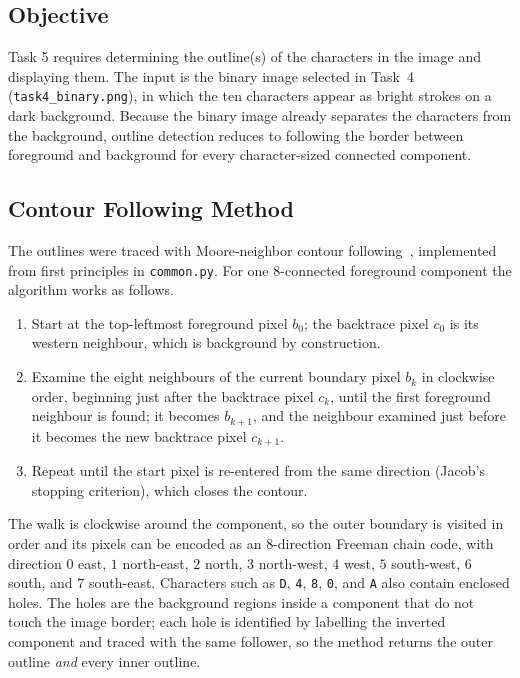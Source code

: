 \subsection{Objective}

Task 5 requires determining the outline(s) of the characters in the image and
displaying them.  The input is the binary image selected in Task~4
(\texttt{task4\_binary.png}), in which the ten characters appear as bright
strokes on a dark background.  Because the binary image already separates the
characters from the background, outline detection reduces to following the
border between foreground and background for every character-sized connected
component.

\subsection{Contour Following Method}

The outlines were traced with Moore-neighbor contour following~\cite{contourtracing}, implemented
from first principles in \texttt{common.py}.  For one 8-connected foreground
component the algorithm works as follows.

\begin{enumerate}
  \item Start at the top-leftmost foreground pixel $b_0$; the backtrace pixel
  $c_0$ is its western neighbour, which is background by construction.
  \item Examine the eight neighbours of the current boundary pixel $b_k$ in
  clockwise order, beginning just after the backtrace pixel $c_k$, until the
  first foreground neighbour is found; it becomes $b_{k+1}$, and the
  neighbour examined just before it becomes the new backtrace pixel
  $c_{k+1}$.
  \item Repeat until the start pixel is re-entered from the same direction
  (Jacob's stopping criterion), which closes the contour.
\end{enumerate}

The walk is clockwise around the component, so the outer boundary is visited
in order and its pixels can be encoded as an 8-direction Freeman chain code,
with direction $0$ east, $1$ north-east, $2$ north, $3$ north-west, $4$ west,
$5$ south-west, $6$ south, and $7$ south-east.  Characters such as
\texttt{D}, \texttt{4}, \texttt{8}, \texttt{0}, and \texttt{A} also contain
enclosed holes.  The holes are the background regions inside a component that
do not touch the image border; each hole is identified by labelling the
inverted component and traced with the same follower, so the method returns
the outer outline \emph{and} every inner outline.

